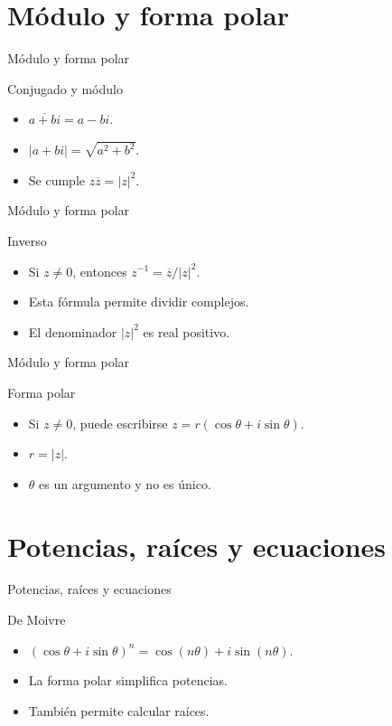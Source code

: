 \documentclass[aspectratio=169,11pt]{beamer}
\begin{document}
\section{Módulo y forma polar}

\begin{frame}{Módulo y forma polar}
\begin{block}{Conjugado y módulo}
\begin{itemize}
  \item \(\overline{a+bi}=a-bi\).
  \item \(|a+bi|=\sqrt{a^2+b^2}\).
  \item Se cumple \(z\overline z=|z|^2\).
\end{itemize}
\end{block}
\end{frame}

\begin{frame}{Módulo y forma polar}
\begin{block}{Inverso}
\begin{itemize}
  \item Si \(z\neq 0\), entonces \(z^{-1}=\overline z/|z|^2\).
  \item Esta fórmula permite dividir complejos.
  \item El denominador \(|z|^2\) es real positivo.
\end{itemize}
\end{block}
\end{frame}

\begin{frame}{Módulo y forma polar}
\begin{block}{Forma polar}
\begin{itemize}
  \item Si \(z\neq 0\), puede escribirse \(z=r(\cos\theta+i\sin\theta)\).
  \item \(r=|z|\).
  \item \(\theta\) es un argumento y no es único.
\end{itemize}
\end{block}
\end{frame}

\section{Potencias, raíces y ecuaciones}

\begin{frame}{Potencias, raíces y ecuaciones}
\begin{block}{De Moivre}
\begin{itemize}
  \item \((\cos\theta+i\sin\theta)^n=\cos(n\theta)+i\sin(n\theta)\).
  \item La forma polar simplifica potencias.
  \item También permite calcular raíces.
\end{itemize}
\end{block}
\end{frame}
\end{document}
